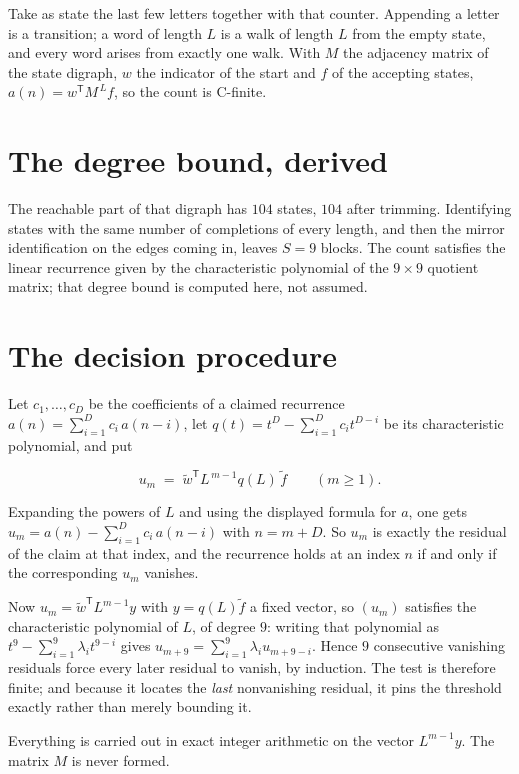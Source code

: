\documentclass[11pt]{article}
\theoremstyle{definition}
\begin{document}
Take as state the last few letters together with that counter. Appending a letter is a transition; a word of length $L$ is a walk of length $L$ from the empty state, and every word arises from exactly one walk. With $M$ the adjacency matrix of the state digraph, $w$ the indicator of the start and $f$ of the accepting states, $a(n) = w^{\mathsf T}M^{\,L}f$, so the count is C-finite.

\section{The degree bound, derived}

The reachable part of that digraph has $104$ states, $104$ after trimming. Identifying states with the same number of completions of every length, and then the mirror identification on the edges coming in, leaves $S = 9$ blocks. The count satisfies the linear recurrence given by the characteristic polynomial of the $9\times9$ quotient matrix; that degree bound is computed here, not assumed.

\section{The decision procedure}

Let $c_1,\dots,c_D$ be the coefficients of a claimed recurrence $a(n) = \sum_{i=1}^{D} c_i\,a(n-i)$, let $q(t) = t^{D} - \sum_{i=1}^{D} c_i t^{D-i}$ be its characteristic polynomial, and put

\[u_m \;=\; \tilde w^{\mathsf T} L^{\,m-1} q(L)\,\tilde f \qquad (m \ge 1).\]

Expanding the powers of $L$ and using the displayed formula for $a$, one gets $u_m = a(n) - \sum_{i=1}^{D} c_i\,a(n-i)$ with $n = m + D$. So $u_m$ is exactly the residual of the claim at that index, and the recurrence holds at an index $n$ if and only if the corresponding $u_m$ vanishes.

Now $u_m = \tilde w^{\mathsf T} L^{m-1} y$ with $y = q(L)\tilde f$ a fixed vector, so $(u_m)$ satisfies the characteristic polynomial of $L$, of degree $9$: writing that polynomial as $t^{9} - \sum_{i=1}^{9} \lambda_i t^{9-i}$ gives $u_{m+9} = \sum_{i=1}^{9} \lambda_i u_{m+9-i}$. Hence $9$ consecutive vanishing residuals force every later residual to vanish, by induction. The test is therefore finite; and because it locates the {\itshape last} nonvanishing residual, it pins the threshold exactly rather than merely bounding it.

Everything is carried out in exact integer arithmetic on the vector $L^{m-1}y$. The matrix $M$ is never formed.
\end{document}

